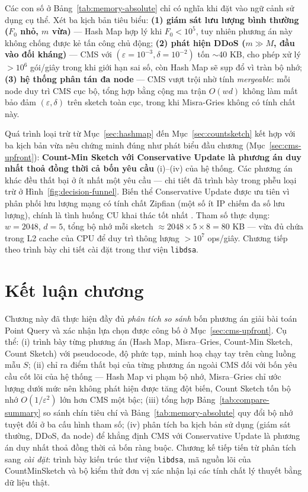 Các con số ở Bảng~\ref{tab:memory-absolute} chỉ có nghĩa khi đặt vào ngữ cảnh sử dụng cụ thể. Xét ba kịch bản tiêu biểu: \textbf{(1) giám sát lưu lượng bình thường ($F_0$ nhỏ, $m$ vừa)} --- Hash Map hợp lý khi $F_0 < 10^5$, tuy nhiên phương án này không chống được kẻ tấn công chủ động; \textbf{(2) phát hiện DDoS ($m \gg M$, đầu vào đối kháng)} --- CMS với $(\varepsilon = 10^{-3}, \delta = 10^{-2})$ tốn $\sim$40 KB, cho phép xử lý $> 10^6$ gói/giây trong khi giới hạn sai số, còn Hash Map sẽ sụp đổ vì tràn bộ nhớ; \textbf{(3) hệ thống phân tán đa node} --- CMS vượt trội nhờ tính \textit{mergeable}: mỗi node duy trì CMS cục bộ, tổng hợp bằng cộng ma trận $O(wd)$ không làm mất bảo đảm $(\varepsilon, \delta)$ trên sketch toàn cục, trong khi Misra-Gries không có tính chất này.

Quá trình loại trừ từ Mục~\ref{sec:hashmap} đến Mục~\ref{sec:countsketch} kết hợp với ba kịch bản vừa nêu chứng minh đúng như phát biểu đầu chương (Mục~\ref{sec:cms-upfront}): \textbf{Count-Min Sketch với Conservative Update là phương án duy nhất thoả đồng thời cả bốn yêu cầu} (i)--(iv) của hệ thống. Các phương án khác đều thất bại ở ít nhất một yêu cầu --- chi tiết đã trình bày trong phễu loại trừ ở Hình~\ref{fig:decision-funnel}. Biến thể Conservative Update được ưu tiên vì phân phối lưu lượng mạng có tính chất Zipfian (một số ít IP chiếm đa số lưu lượng), chính là tình huống CU khai thác tốt nhất \cite{estan2003conservative}. Tham số thực dụng: $w = 2048$, $d = 5$, tổng bộ nhớ mỗi sketch $\approx 2048 \times 5 \times 8 = 80$ KB --- vừa đủ chứa trong L2 cache của CPU để duy trì thông lượng $>10^7$ ops/giây. Chương tiếp theo trình bày chi tiết cài đặt trong thư viện \texttt{libdsa}.

\section{Kết luận chương}

Chương này đã thực hiện đầy đủ \textit{phân tích so sánh} bốn phương án giải bài toán Point Query và xác nhận lựa chọn được công bố ở Mục~\ref{sec:cms-upfront}. Cụ thể: (i) trình bày từng phương án (Hash Map, Misra--Gries, Count-Min Sketch, Count Sketch) với pseudocode, độ phức tạp, minh hoạ chạy tay trên cùng luồng mẫu $S$; (ii) chỉ ra điểm thất bại của từng phương án ngoài CMS đối với bốn yêu cầu cốt lõi của hệ thống --- Hash Map vi phạm bộ nhớ, Misra--Gries chỉ ước lượng dưới mức nên không phát hiện được tăng đột biến, Count Sketch tốn bộ nhớ $O(1/\varepsilon^2)$ lớn hơn CMS một bậc; (iii) tổng hợp Bảng~\ref{tab:compare-summary} so sánh chín tiêu chí và Bảng~\ref{tab:memory-absolute} quy đổi bộ nhớ tuyệt đối ở ba cấu hình tham số; (iv) phân tích ba kịch bản sử dụng (giám sát thường, DDoS, đa node) để khẳng định CMS với Conservative Update là phương án duy nhất thoả đồng thời cả bốn ràng buộc. Chương kế tiếp tiến từ phân tích sang \textit{cài đặt}: trình bày kiến trúc thư viện \texttt{libdsa}, mã nguồn lõi của CountMinSketch và bộ kiểm thử đơn vị xác nhận lại các tính chất lý thuyết bằng dữ liệu thật.
